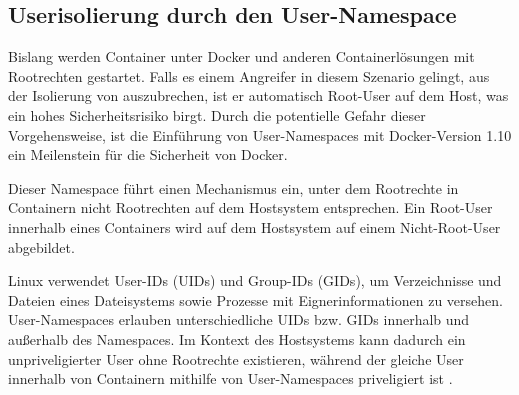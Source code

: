 \documentclass[../main.tex]{subfiles}
\begin{document}


    \subsection{Userisolierung durch den User-Namespace}
			Bislang werden Container unter Docker und anderen Containerlösungen mit Rootrechten gestartet. Falls es einem Angreifer in diesem Szenario gelingt, aus der Isolierung von \cbroken{} auszubrechen, ist er automatisch Root-User auf dem Host, was ein hohes Sicherheitsrisiko birgt. Durch die potentielle Gefahr dieser Vorgehensweise, ist die Einführung von User-Namespaces mit Docker-Version 1.10 ein Meilenstein für die Sicherheit von Docker.

			Dieser Namespace führt einen Mechanismus ein, unter dem Rootrechte in Containern nicht Rootrechten auf dem Hostsystem entsprechen. Ein Root-User innerhalb eines Containers wird auf dem Hostsystem auf einem Nicht-Root-User abgebildet.

			Linux verwendet User-IDs (UIDs) und Group-IDs (GIDs), um Verzeichnisse und Dateien eines Dateisystems sowie Prozesse mit Eignerinformationen zu versehen. User-Namespaces erlauben unterschiedliche UIDs bzw. GIDs innerhalb und außerhalb des Namespaces. Im Kontext des Hostsystems kann dadurch ein unpriveligierter User ohne Rootrechte existieren, während der gleiche User innerhalb von Containern mithilfe von User-Namespaces priveligiert ist \cite{nsUser}.

\end{document}
